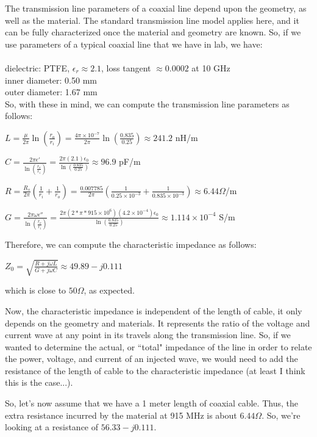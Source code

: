 \documentclass[12pt,onecolumn,titlepage]{article}
\begin{document}
The transmission line parameters of a coaxial line depend upon the geometry, as well as the material. The standard transmission line model applies here, and it can be fully characterized once the material and geometry are known. So, if we use parameters of a typical coaxial line that we have in lab, we have: \\
\\
dielectric: PTFE, $\epsilon_r \approx 2.1$, loss tangent $\approx 0.0002$ at 10 GHz \\
inner diameter: 0.50 mm \\
outer diameter: 1.67 mm \\

So, with these in mind, we can compute the transmission line parameters as follows:

$L = \frac{\mu}{2 \pi} \ln \left( \frac{r_o}{r_i} \right) = \frac{4 \pi \times 10^{-7}}{2 \pi} \ln \left( \frac{0.835}{0.25} \right) \approx 241.2$ nH/m

$C = \frac{2 \pi \epsilon'}{\ln \left( \frac{r_o}{r_i} \right) } = \frac{2 \pi (2.1) \epsilon_0}{\ln \left( \frac{0.835}{0.25} \right) } \approx 96.9$ pF/m

$R = \frac{R_s}{2 \pi} \left( \frac{1}{r_i} + \frac{1}{r_o} \right) = \frac{0.007785}{2 \pi} \left( \frac{1}{0.25 \times 10^{-3}} + \frac{1}{0.835 \times 10^{-3}} \right) \approx 6.44 \Omega$/m

$G = \frac{2 \pi \omega \epsilon''}{\ln \left( \frac{r_o}{r_i} \right) } = \frac{2 \pi (2 * \pi * 915 \times 10^6)(4.2 \times 10^{-4}) \epsilon_0}{\ln \left( \frac{0.835}{0.25} \right)} \approx 1.114 \times 10^{-4}$ S/m


Therefore, we can compute the characteristic impedance as follows:

$ Z_0 = \sqrt{ \frac{R + j \omega L}{G + j \omega C}} \approx 49.89 - j 0.111$

which is close to $50 \Omega$, as expected.


Now, the characteristic impedance is independent of the length of cable, it only depends on the geometry and materials. It represents the ratio of the voltage and current wave at any point in its travels along the transmission line. So, if we wanted to determine the actual, or ``total" impedance of the line in order to relate the power, voltage, and current of an injected wave, we would need to add the resistance of the length of cable to the characteristic impedance (at least I think this is the case...). 

So, let's now assume that we have a 1 meter length of coaxial cable. Thus, the extra resistance incurred by the material at 915 MHz is about $6.44 \Omega$. So, we're looking at a resistance of $56.33 - j 0.111$.
\end{document}
